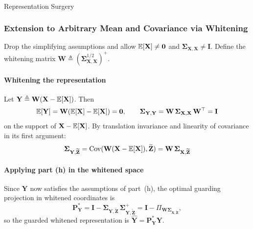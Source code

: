 \begin{question}{Representation Surgery}
\begin{subquestion}
\end{subquestion}

\begin{subquestion}

\subsubsection*{Extension to Arbitrary Mean and Covariance via Whitening}

Drop the simplifying assumptions and allow $\expectation[\mathbf{X}] \neq \mathbf{0}$ and $\boldsymbol{\Sigma}_{\mathbf{X}, \mathbf{X}} \neq \mathbf{I}$. Define the whitening matrix $\mathbf{W} \triangleq \left(\boldsymbol{\Sigma}_{\mathbf{X}, \mathbf{X}}^{1/2}\right)^+$.

\paragraph{Whitening the representation}

Let $\mathbf{Y} \triangleq \mathbf{W}(\mathbf{X} - \expectation[\mathbf{X}])$. Then
\begin{equation}
    \expectation[\mathbf{Y}] = \mathbf{W}(\expectation[\mathbf{X}] - \expectation[\mathbf{X}]) = \mathbf{0}, \qquad \boldsymbol{\Sigma}_{\mathbf{Y}, \mathbf{Y}} = \mathbf{W}\, \boldsymbol{\Sigma}_{\mathbf{X}, \mathbf{X}}\, \mathbf{W}^\top = \mathbf{I}
\end{equation}
on the support of $\mathbf{X} - \expectation[\mathbf{X}]$. By translation invariance and linearity of covariance in its first argument:
\begin{equation}
    \boldsymbol{\Sigma}_{\mathbf{Y}, \widetilde{\mathbf{Z}}} = \mathrm{Cov}(\mathbf{W}(\mathbf{X} - \expectation[\mathbf{X}]), \widetilde{\mathbf{Z}}) = \mathbf{W}\, \boldsymbol{\Sigma}_{\mathbf{X}, \widetilde{\mathbf{Z}}}
\end{equation}

\paragraph{Applying part (h) in the whitened space}

Since $\mathbf{Y}$ now satisfies the assumptions of part~(h), the optimal guarding projection in whitened coordinates is
\begin{equation}
    \mathbf{P}_{\mathbf{Y}}^\ast = \mathbf{I} - \boldsymbol{\Sigma}_{\mathbf{Y}, \widetilde{\mathbf{Z}}}\, \boldsymbol{\Sigma}_{\mathbf{Y}, \widetilde{\mathbf{Z}}}^+ = \mathbf{I} - \Pi_{\mathbf{W}\boldsymbol{\Sigma}_{\mathbf{X}, \widetilde{\mathbf{Z}}}},
\end{equation}
so the guarded whitened representation is $\widehat{\mathbf{Y}} = \mathbf{P}_{\mathbf{Y}}^\ast \mathbf{Y}$.


\end{subquestion}
\end{question}
